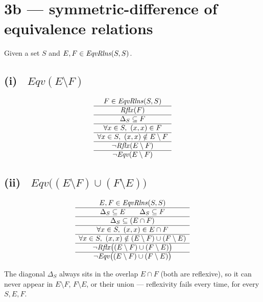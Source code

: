 \documentclass[11pt]{article}
\newcommand{\op}[1]{\mathit{#1}}
\newcommand{\Eqv}{\op{Eqv}} \newcommand{\PO}{\op{PO}} \newcommand{\DG}{\op{DG}}
\newcommand{\seclabel}[1]{\noindent\fbox{\textbf{#1}}\par\smallskip}
\begin{document}
\clearpage
\section*{3b --- symmetric-difference of equivalence relations}
Given a set $S$ and $E,F\in\EqvRlns(S,S)$.

\subsection*{(i) \circn\ $\Eqv(E\setminus F)$}
\seclabel{3b.i}
\[
\begin{array}{c}
F\in\EqvRlns(S,S)\\
\hline
\op{Rflx}(F)\\
\hline
\Delta_S\subseteq F\\
\hline
\forall x\in S,\ (x,x)\in F\\
\hline
\forall x\in S,\ (x,x)\notin E\setminus F\\
\hline
\neg\op{Rflx}(E\setminus F)\\
\hline
\neg\Eqv(E\setminus F)
\end{array}
\]

\subsection*{(ii) \circn\ $\Eqv\big((E\setminus F)\cup(F\setminus E)\big)$}
\seclabel{3b.ii}
\[
\begin{array}{c}
E,F\in\EqvRlns(S,S)\\
\hline
\Delta_S\subseteq E \qquad \Delta_S\subseteq F\\
\hline
\Delta_S\subseteq(E\cap F)\\
\hline
\forall x\in S,\ (x,x)\in E\cap F\\
\hline
\forall x\in S,\ (x,x)\notin(E\setminus F)\cup(F\setminus E)\\
\hline
\neg\op{Rflx}\big((E\setminus F)\cup(F\setminus E)\big)\\
\hline
\neg\Eqv\big((E\setminus F)\cup(F\setminus E)\big)
\end{array}
\]

\begin{center}
\end{center}
The diagonal $\Delta_S$ always sits in the overlap $E\cap F$ (both are reflexive), so it can never appear in $E\setminus F$, $F\setminus E$, or their union --- reflexivity fails every time, for every $S,E,F$.
\end{document}
